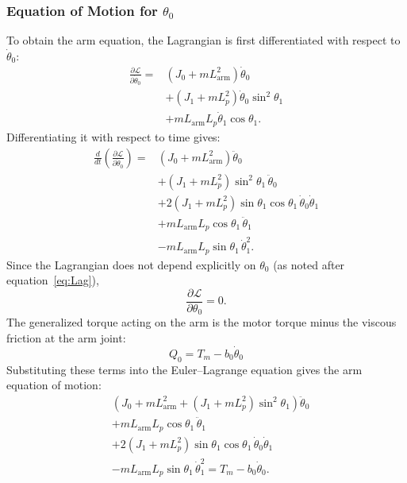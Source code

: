 \documentclass[a4paper,11pt]{article}
\newcommand{\La}{L_{\mathrm{arm}}}
\begin{document}
\subsubsection{Equation of Motion for \texorpdfstring{$\theta_0$}{theta0}}
To obtain the arm equation, the Lagrangian is first differentiated with respect to $\dot\theta_0$:
\begin{equation}
\begin{aligned}
  \frac{\partial \mathcal{L}}{\partial \dot\theta_0} = {}& \left(J_0 + m \La^2\right)\dot\theta_0\\
  & + \left(J_1 + m L_p^2\right)\dot\theta_0 \sin^2\theta_1\\
  & + m \La L_p \dot\theta_1 \cos\theta_1 .
\end{aligned}
\end{equation}
Differentiating it with respect to time gives:
\begin{equation}
\begin{aligned}
  \frac{d}{dt}\left(\frac{\partial \mathcal{L}}{\partial \dot\theta_0}\right) = {}& \left(J_0 + m \La^2\right)\ddot\theta_0\\
  & + \left(J_1 + m L_p^2\right)\sin^2\theta_1\,\ddot\theta_0\\
  & + 2\left(J_1 + m L_p^2\right)\sin\theta_1 \cos\theta_1\,\dot\theta_0 \dot\theta_1\\
  & + m \La L_p \cos\theta_1\,\ddot\theta_1\\
  & - m \La L_p \sin\theta_1\,\dot\theta_1^2 .
\end{aligned}
\end{equation}
Since the Lagrangian does not depend explicitly on $\theta_0$ (as noted after equation~\ref{eq:Lag}),
\begin{equation}
  \frac{\partial \mathcal{L}}{\partial \theta_0} = 0 .
\end{equation}
The generalized torque acting on the arm is the motor torque minus the viscous friction at the arm joint:
\begin{equation}
  Q_0 = T_m - b_0 \dot\theta_0
\end{equation}
Substituting these terms into the Euler--Lagrange equation gives the arm equation of motion:
\begin{equation}
\begin{aligned}
  & \left(J_0 + m \La^2 + \left(J_1 + m L_p^2\right)\sin^2\theta_1\right)\ddot\theta_0\\
  & + m \La L_p \cos\theta_1\,\ddot\theta_1\\
  & + 2\left(J_1 + m L_p^2\right)\sin\theta_1 \cos\theta_1\,\dot\theta_0 \dot\theta_1\\
  & - m \La L_p \sin\theta_1\,\dot\theta_1^2 = T_m - b_0 \dot\theta_0 .
\end{aligned}
\end{equation}
\end{document}

